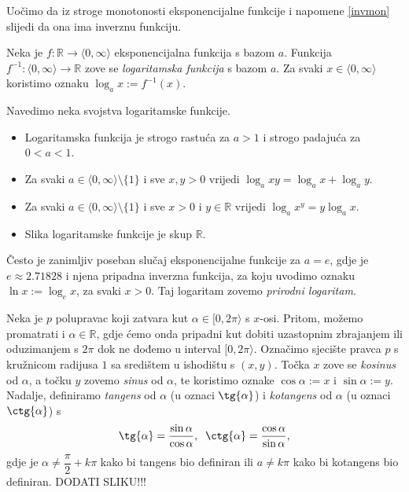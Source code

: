 Uočimo da iz stroge monotonosti eksponencijalne funkcije i napomene \ref{invmon} slijedi da ona ima inverznu funkciju.
\begin{definition}
Neka je $f : \mathbb{R}\to \langle 0, \infty\rangle$ eksponencijalna funkcija s bazom $a$. Funkcija $f^{-1} : \langle 0, \infty\rangle\to \mathbb{R}$ zove se \textit{logaritamska funkcija} s bazom $a$. Za svaki $x\in \langle 0, \infty\rangle$ koristimo oznaku $\log_a{x}:=f^{-1}(x)$.
\end{definition}
Navedimo neka svojstva logaritamske funkcije.
\begin{itemize}
\item Logaritamska funkcija je strogo rastuća za $a>1$ i strogo padajuća za $0<a<1$.
\item Za svaki $a\in \langle 0, \infty\rangle\setminus\{1\}$ i sve $x, y>0$ vrijedi $\log_a{xy}=\log_a{x}+\log_a{y}$.
\item Za svaki $a\in \langle 0, \infty\rangle\setminus\{1\}$ i sve $x>0$ i $y\in \mathbb{R}$ vrijedi $\log_a{x^y}=y\log_a{x}$.
\item Slika logaritamske funkcije je skup $\mathbb{R}$.
\end{itemize}
Često je zanimljiv poseban slučaj eksponencijalne funkcije za $a=e$, gdje je $e\approx 2.71828$ i njena pripadna inverzna funkcija, za koju uvodimo oznaku $\ln{x}:=\log_e{x}$, za svaki $x>0$. Taj logaritam zovemo \textit{prirodni logaritam}.

Neka je $p$ polupravac koji zatvara kut $\alpha\in [0, 2\pi\rangle$ s $x$-osi. Pritom, možemo promatrati i $\alpha\in \mathbb{R}$, gdje ćemo onda pripadni kut dobiti uzastopnim zbrajanjem ili oduzimanjem s $2\pi$ dok ne dođemo u interval $[0, 2\pi\rangle$. Označimo sjecište pravca $p$ s kružnicom radijusa $1$ sa središtem u ishodištu s $(x, y)$. Točka $x$ zove se \textit{kosinus} od $\alpha$, a točku $y$ zovemo \textit{sinus} od $\alpha$, te koristimo oznake $\cos{\alpha}:=x$ i $\sin{\alpha}:=y$. Nadalje, definiramo \textit{tangens} od $\alpha$ (u oznaci $\tg{\alpha}$) i \textit{kotangens} od $\alpha$ (u oznaci $\ctg{\alpha}$) s
$$\tg{\alpha}=\dfrac{\sin{\alpha}}{\cos{\alpha}},\;\; \ctg{\alpha}=\dfrac{\cos{\alpha}}{\sin{\alpha}},$$
gdje je $\alpha\neq \dfrac{\pi}{2}+k\pi$ kako bi tangens bio definiran ili $a\neq k\pi$ kako bi kotangens bio definiran. DODATI SLIKU!!!

